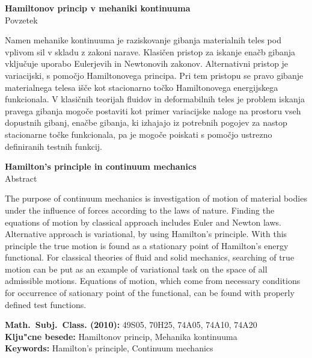 \begin{center}
{\bf Hamiltonov princip v mehaniki kontinuuma}\\[3mm]
{\sc Povzetek}
\end{center}

Namen mehanike kontinuuma je raziskovanje gibanja materialnih teles pod
vplivom sil v skladu z zakoni narave. Klasičen pristop za iskanje enačb gibanja
vključuje uporabo Eulerjevih in Newtonovih zakonov. Alternativni pristop
je variacijski, s pomočjo Hamiltonovega principa. Pri tem pristopu se pravo
gibanje materialnega telesa išče kot stacionarno točko Hamiltonovega
energijskega funkcionala. V klasičnih teorijah fluidov in deformabilnih teles je problem
iskanja pravega gibanja
mogoče postaviti kot primer variacijske naloge na prostoru vseh dopustnih gibanj,
enačbe gibanja, ki izhajajo iz potrebnih pogojev za nastop stacionarne točke
funkcionala, pa je mogoče poiskati s pomočjo ustrezno definiranih testnih funkcij.

\vfill
\begin{center}
{\bf Hamilton's principle in continuum mechanics}\\[3mm]
{\sc Abstract}
\end{center}

The purpose of continuum mechanics is investigation of motion of material bodies
under the influence of forces according to the laws of nature. Finding the equations of motion
by classical approach includes Euler and Newton laws. Alternative approach is
variational, by using Hamilton's principle. With this principle the true motion
is found as a stationary point of Hamilton's energy functional. For classical
theories of fluid and solid mechanics, searching of true motion can be put
as an example of variational task on the space of all admissible motions.
Equations of motion, which come from necessary conditions for occurrence
of sationary point of the functional, can be found with properly defined test functions.


\vfill\noindent
{\bf Math.~Subj.~Class. (2010):} 49S05, 70H25, 74A05, 74A10, 74A20  \\[1mm]  
{\bf Klju"cne besede:} Hamiltonov princip, Mehanika kontinuuma \\[1mm]  
{\bf Keywords:} Hamilton's principle, Continuum mechanics